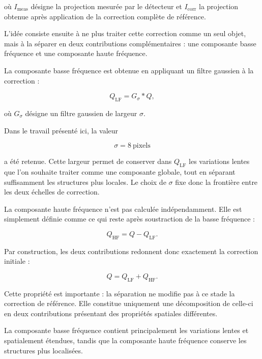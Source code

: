 \documentclass[11pt,a4paper]{report}
\begin{document}
où $I_{\mathrm{meas}}$ désigne la projection mesurée par le détecteur et
$I_{\mathrm{corr}}$ la projection obtenue après application de la correction
complète de référence.

L'idée consiste ensuite à ne plus traiter cette correction comme un seul
objet, mais à la séparer en deux contributions complémentaires : une
composante basse fréquence et une composante haute fréquence.

La composante basse fréquence est obtenue en appliquant un filtre gaussien
à la correction :

\begin{equation}
Q_{\mathrm{LF}}
=
G_\sigma * Q,
\label{eq:lf}
\end{equation}

où $G_\sigma$ désigne un filtre gaussien de largeur $\sigma$.

Dans le travail présenté ici, la valeur

\begin{equation}
\sigma = 8\ \mathrm{pixels}
\end{equation}

a été retenue. Cette largeur permet de conserver dans $Q_{\mathrm{LF}}$ les
variations lentes que l'on souhaite traiter comme une composante globale,
tout en séparant suffisamment les structures plus locales. Le choix de
$\sigma$ fixe donc la frontière entre les deux échelles de correction.

La composante haute fréquence n'est pas calculée indépendamment. Elle est
simplement définie comme ce qui reste après soustraction de la basse
fréquence :

\begin{equation}
Q_{\mathrm{HF}}
=
Q
-
Q_{\mathrm{LF}}.
\label{eq:hf}
\end{equation}

Par construction, les deux contributions redonnent donc exactement la
correction initiale :

\begin{equation}
Q
=
Q_{\mathrm{LF}}
+
Q_{\mathrm{HF}}.
\label{eq:sum_lf_hf}
\end{equation}

Cette propriété est importante : la séparation ne modifie pas à ce stade
la correction de référence. Elle constitue uniquement une décomposition
de celle-ci en deux contributions présentant des propriétés spatiales
différentes.

La composante basse fréquence contient principalement les variations
lentes et spatialement étendues, tandis que la composante haute fréquence
conserve les structures plus localisées.
\end{document}
